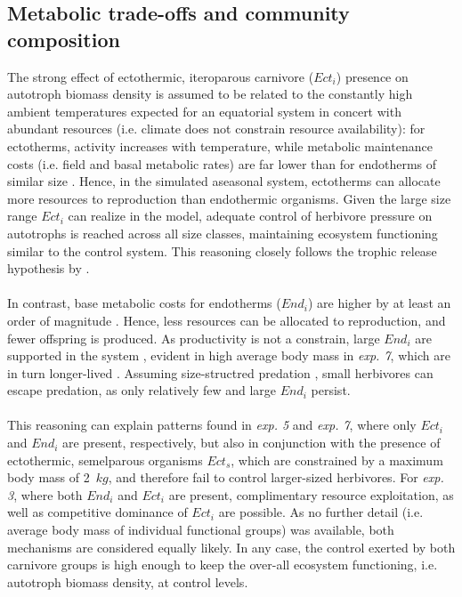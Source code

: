 \subsection{Metabolic trade-offs and community composition}
The strong effect of ectothermic, iteroparous carnivore ($Ect_i$) presence on autotroph biomass density is assumed to be related to the constantly high ambient temperatures expected for an equatorial system in concert with abundant resources (i.e. climate does not constrain resource availability): for ectotherms, activity increases with temperature, while metabolic maintenance costs (i.e. field and basal metabolic rates) are  far lower than for endotherms of similar size \citep{Nagy2005,Buckley2012}. 
Hence, in the simulated aseasonal system, ectotherms can allocate more resources to reproduction than endothermic organisms. 
Given the large size range $Ect_i$ can realize in the model,  adequate control of herbivore pressure on autotrophs is reached across all size classes, maintaining ecosystem functioning similar to the control system. 
This reasoning closely follows the trophic release hypothesis by \cite{Hairston1960}. 
\\\\
In contrast, base metabolic costs for endotherms ($End_i$) are higher by at least an order of magnitude \citep{Nagy2005}. 
Hence, less resources can be allocated to reproduction, and fewer offspring is produced. 
As productivity is not a constrain, large $End_i$ are supported in the system \citep{Smith2011}, evident in high average body mass in \textit{exp. 7}, which are in turn longer-lived \citep{Speakman2005}. 
Assuming size-structred predation \citep{Williams2010}, small herbivores can escape predation, as only relatively few and large $End_i$ persist. \\\\
This reasoning can explain patterns found in \textit{exp. 5} and \textit{exp. 7}, where only $Ect_i$ and $End_i$ are present, respectively, but also in conjunction with the presence of ectothermic, semelparous organisms  $Ect_s$, which are constrained by a maximum body mass of 2~$kg$, and therefore fail to control larger-sized herbivores. For \textit{exp. 3}, where both $End_i$ and $Ect_i$ are present, complimentary resource exploitation, as well as competitive dominance of $Ect_i$ are possible. As no further detail (i.e. average body mass of individual functional groups) was available, both mechanisms are considered equally likely. In any case, the control exerted by both carnivore groups is high enough to keep the over-all ecosystem functioning, i.e. autotroph biomass density, at control levels.
%
